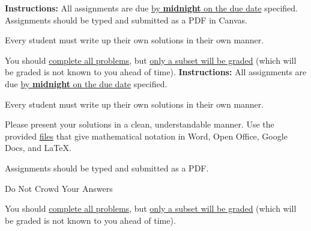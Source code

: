 
\extrawidth{0.5in} \extrafootheight{-0in} \pagestyle{headandfoot}
\headrule {} \footrule {}


\ifprintanswers
\noindent \textbf{Instructions:} All assignments are due \underline{by \textbf{midnight} on the due date} specified.  Assignments should be typed and submitted as a PDF in Canvas.   

\medskip
\noindent Every student must write up their own solutions in their own manner.

\medskip
\noindent You should \underline{complete all problems}, but \underline{only a subset will be graded} (which will be graded is not known to you ahead of time). 
\else
\noindent \textbf{Instructions:} All assignments are due \underline{by \textbf{midnight} on the due date} specified.  

\medskip
\noindent Every student must write up their own solutions in their own manner.

\medskip
\noindent Please present your solutions in a clean, understandable
manner.  Use the provided \href{https://mtu.instructure.com/courses/1184060/pages/help-for-typing-hw}{files} that give mathematical notation in Word, Open Office, Google Docs, and \LaTeX. 

\medskip
\noindent Assignments should be typed and submitted as a PDF. 

\medskip 
\noindent  Do Not Crowd Your Answers

\medskip
\noindent You should \underline{complete all problems}, but \underline{only a subset will be graded} (which will be graded is not known to you ahead of time). 
\fi


